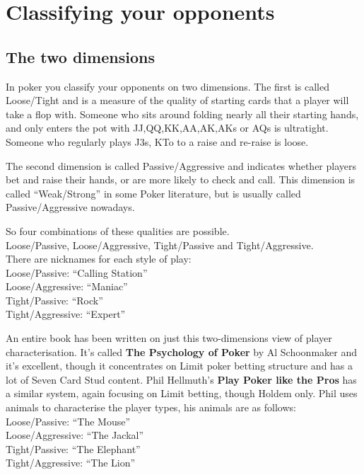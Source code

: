 \chapter{Classifying your opponents}


\section{The two dimensions}

In poker you classify your opponents on two dimensions.
The first is called Loose/Tight and is a measure of the quality
of starting cards that a player will take a flop with. Someone
who sits around folding nearly all their starting hands, and
only enters the pot with JJ,QQ,KK,AA,AK,AKs or AQs is ultratight.
Someone who regularly plays J3s, KTo to a raise and re-raise is loose.

The second dimension is called Passive/Aggressive and indicates
whether players bet and raise their hands, or are more likely
to check and call. This dimension is called ``Weak/Strong'' in some
Poker literature, but is usually called Passive/Aggressive nowadays.

So four combinations of these qualities are possible. \\
Loose/Passive, Loose/Aggressive, Tight/Passive and Tight/Aggressive. \\
There are nicknames for each style of play: \\
Loose/Passive: ``Calling Station'' \\
Loose/Aggressive: ``Maniac'' \\
Tight/Passive: ``Rock'' \\
Tight/Aggressive: ``Expert''

An entire book has been written on just this two-dimensions view
of player characterisation. It's called \textbf{The Psychology of Poker}
by Al Schoonmaker and it's excellent, though it concentrates
on Limit poker betting structure and has a lot of Seven Card Stud
content. Phil Hellmuth's \textbf{Play Poker like the Pros} has a
similar system, again focusing on Limit betting, though Holdem only.
Phil uses animals to characterise the player types, his animals are
as follows: \\
Loose/Passive: ``The Mouse'' \\
Loose/Aggressive: ``The Jackal'' \\
Tight/Passive: ``The Elephant'' \\
Tight/Aggressive: ``The Lion''

